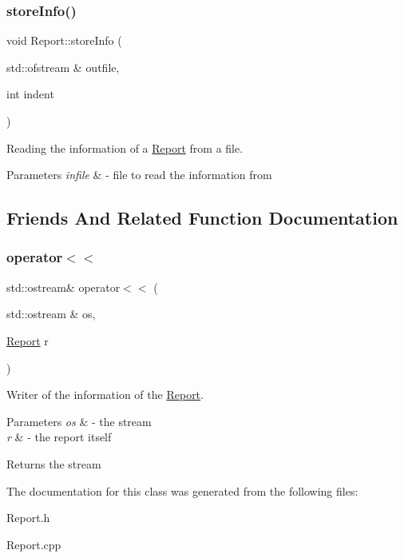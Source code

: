 \subsubsection{\texorpdfstring{store\+Info()}{storeInfo()}}
{\footnotesize\ttfamily void Report\+::store\+Info (\begin{DoxyParamCaption}\item[{std\+::ofstream \&}]{outfile,  }\item[{int}]{indent }\end{DoxyParamCaption})}



Reading the information of a \mbox{\hyperlink{class_report}{Report}} from a file. 


\begin{DoxyParams}{Parameters}
{\em infile} & -\/ file to read the information from \\
\hline
\end{DoxyParams}


\subsection{Friends And Related Function Documentation}
\mbox{\label{class_report_a9c2eaa693abfadab4a6e151daee874e4}} 
\subsubsection{\texorpdfstring{operator$<$$<$}{operator<<}}
{\footnotesize\ttfamily std\+::ostream\& operator$<$$<$ (\begin{DoxyParamCaption}\item[{std\+::ostream \&}]{os,  }\item[{\mbox{\hyperlink{class_report}{Report}}}]{r }\end{DoxyParamCaption})\hspace{0.3cm}{\ttfamily [friend]}}



Writer of the information of the \mbox{\hyperlink{class_report}{Report}}. 


\begin{DoxyParams}{Parameters}
{\em os} & -\/ the stream \\
\hline
{\em r} & -\/ the report itself \\
\hline
\end{DoxyParams}
\begin{DoxyReturn}{Returns}
the stream 
\end{DoxyReturn}


The documentation for this class was generated from the following files\+:\begin{DoxyCompactItemize}
\item 
Report.\+h\item 
Report.\+cpp\end{DoxyCompactItemize}
